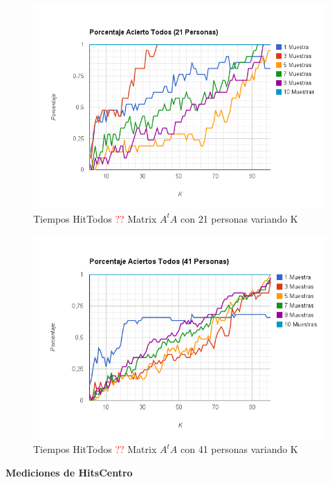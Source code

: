 \begin{figure}[H]
\includegraphics[width=1\textwidth]{img/image11.png}
     \caption{Tiempos HitTodos \textcolor{red}{??} Matrix $A^tA$ con 21 personas variando K}
     \label{fig:figura1}
\end{figure}

\begin{figure}[H]
\includegraphics[width=1\textwidth]{img/image12.png}
     \caption{Tiempos HitTodos \textcolor{red}{??} Matrix $A^tA$ con 41 personas variando K}
     \label{fig:figura1}
\end{figure}





\textbf{Mediciones de HitsCentro }

